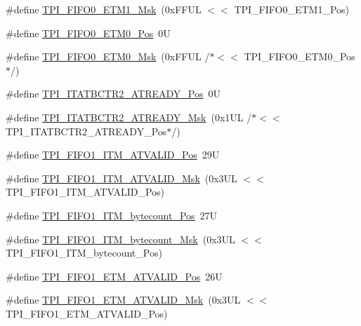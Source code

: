 \begin{DoxyCompactItemize}
\item 
\#define \hyperlink{group___c_m_s_i_s___t_p_i_gaad9c1a6ed34a70905005a0cc14d5f01b}{T\-P\-I\-\_\-\-F\-I\-F\-O0\-\_\-\-E\-T\-M1\-\_\-\-Msk}~(0x\-F\-F\-U\-L $<$$<$ T\-P\-I\-\_\-\-F\-I\-F\-O0\-\_\-\-E\-T\-M1\-\_\-\-Pos)
\item 
\#define \hyperlink{group___c_m_s_i_s___t_p_i_ga48783ce3c695d8c06b1352a526110a87}{T\-P\-I\-\_\-\-F\-I\-F\-O0\-\_\-\-E\-T\-M0\-\_\-\-Pos}~0\-U
\item 
\#define \hyperlink{group___c_m_s_i_s___t_p_i_gaf924f7d1662f3f6c1da12052390cb118}{T\-P\-I\-\_\-\-F\-I\-F\-O0\-\_\-\-E\-T\-M0\-\_\-\-Msk}~(0x\-F\-F\-U\-L /$\ast$$<$$<$ T\-P\-I\-\_\-\-F\-I\-F\-O0\-\_\-\-E\-T\-M0\-\_\-\-Pos$\ast$/)
\item 
\#define \hyperlink{group___c_m_s_i_s___t_p_i_ga6959f73d7db4a87ae9ad9cfc99844526}{T\-P\-I\-\_\-\-I\-T\-A\-T\-B\-C\-T\-R2\-\_\-\-A\-T\-R\-E\-A\-D\-Y\-\_\-\-Pos}~0\-U
\item 
\#define \hyperlink{group___c_m_s_i_s___t_p_i_ga1859502749709a2e5ead9a2599d998db}{T\-P\-I\-\_\-\-I\-T\-A\-T\-B\-C\-T\-R2\-\_\-\-A\-T\-R\-E\-A\-D\-Y\-\_\-\-Msk}~(0x1\-U\-L /$\ast$$<$$<$ T\-P\-I\-\_\-\-I\-T\-A\-T\-B\-C\-T\-R2\-\_\-\-A\-T\-R\-E\-A\-D\-Y\-\_\-\-Pos$\ast$/)
\item 
\#define \hyperlink{group___c_m_s_i_s___t_p_i_ga08edfc862b2c8c415854cc4ae2067dfb}{T\-P\-I\-\_\-\-F\-I\-F\-O1\-\_\-\-I\-T\-M\-\_\-\-A\-T\-V\-A\-L\-I\-D\-\_\-\-Pos}~29\-U
\item 
\#define \hyperlink{group___c_m_s_i_s___t_p_i_gabc1f6a3b6cac0099d7c01ca949b4dd08}{T\-P\-I\-\_\-\-F\-I\-F\-O1\-\_\-\-I\-T\-M\-\_\-\-A\-T\-V\-A\-L\-I\-D\-\_\-\-Msk}~(0x3\-U\-L $<$$<$ T\-P\-I\-\_\-\-F\-I\-F\-O1\-\_\-\-I\-T\-M\-\_\-\-A\-T\-V\-A\-L\-I\-D\-\_\-\-Pos)
\item 
\#define \hyperlink{group___c_m_s_i_s___t_p_i_gaa22ebf7c86e4f4b2c98cfd0b5981375a}{T\-P\-I\-\_\-\-F\-I\-F\-O1\-\_\-\-I\-T\-M\-\_\-bytecount\-\_\-\-Pos}~27\-U
\item 
\#define \hyperlink{group___c_m_s_i_s___t_p_i_gacba2edfc0499828019550141356b0dcb}{T\-P\-I\-\_\-\-F\-I\-F\-O1\-\_\-\-I\-T\-M\-\_\-bytecount\-\_\-\-Msk}~(0x3\-U\-L $<$$<$ T\-P\-I\-\_\-\-F\-I\-F\-O1\-\_\-\-I\-T\-M\-\_\-bytecount\-\_\-\-Pos)
\item 
\#define \hyperlink{group___c_m_s_i_s___t_p_i_ga3177b8d815cf4a707a2d3d3d5499315d}{T\-P\-I\-\_\-\-F\-I\-F\-O1\-\_\-\-E\-T\-M\-\_\-\-A\-T\-V\-A\-L\-I\-D\-\_\-\-Pos}~26\-U
\item 
\#define \hyperlink{group___c_m_s_i_s___t_p_i_ga0e8f29a1e9378d1ceb0708035edbb86d}{T\-P\-I\-\_\-\-F\-I\-F\-O1\-\_\-\-E\-T\-M\-\_\-\-A\-T\-V\-A\-L\-I\-D\-\_\-\-Msk}~(0x3\-U\-L $<$$<$ T\-P\-I\-\_\-\-F\-I\-F\-O1\-\_\-\-E\-T\-M\-\_\-\-A\-T\-V\-A\-L\-I\-D\-\_\-\-Pos)

\end{DoxyCompactItemize}
